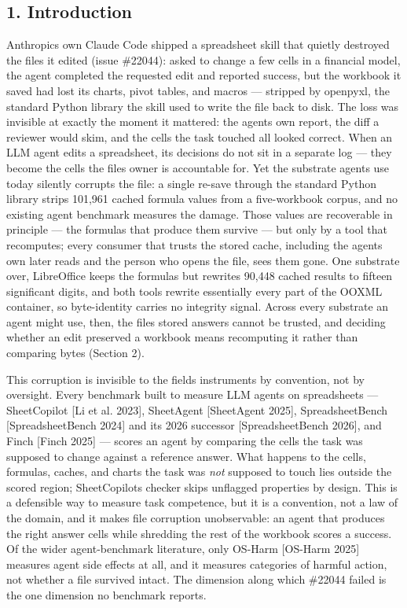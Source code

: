 \documentclass[
]{article}
\begin{document}
\subsection{1. Introduction}\label{1-introduction}

Anthropic\textquotesingle s own Claude Code shipped a spreadsheet skill
that quietly destroyed the files it edited (issue \#22044): asked to
change a few cells in a financial model, the agent completed the
requested edit and reported success, but the workbook it saved had lost
its charts, pivot tables, and macros --- stripped by openpyxl, the
standard Python library the skill used to write the file back to disk.
The loss was invisible at exactly the moment it mattered: the
agent\textquotesingle s own report, the diff a reviewer would skim, and
the cells the task touched all looked correct. When an LLM agent edits a
spreadsheet, its decisions do not sit in a separate log --- they become
the cells the file\textquotesingle s owner is accountable for. Yet the
substrate agents use today silently corrupts the file: a single re-save
through the standard Python library strips 101,961 cached formula values
from a five-workbook corpus, and no existing agent benchmark measures
the damage. Those values are recoverable in principle --- the formulas
that produce them survive --- but only by a tool that recomputes; every
consumer that trusts the stored cache, including the
agent\textquotesingle s own later reads and the person who opens the
file, sees them gone. One substrate over, LibreOffice keeps the formulas
but rewrites 90,448 cached results to fifteen significant digits, and
both tools rewrite essentially every part of the OOXML container, so
byte-identity carries no integrity signal. Across every substrate an
agent might use, then, the file\textquotesingle s stored answers cannot
be trusted, and deciding whether an edit preserved a workbook means
recomputing it rather than comparing bytes (Section 2).

This corruption is invisible to the field\textquotesingle s instruments
by convention, not by oversight. Every benchmark built to measure LLM
agents on spreadsheets --- SheetCopilot {[}Li et al. 2023{]}, SheetAgent
{[}SheetAgent 2025{]}, SpreadsheetBench {[}SpreadsheetBench 2024{]} and
its 2026 successor {[}SpreadsheetBench 2026{]}, and Finch {[}Finch
2025{]} --- scores an agent by comparing the cells the task was supposed
to change against a reference answer. What happens to the cells,
formulas, caches, and charts the task was \emph{not} supposed to touch
lies outside the scored region; SheetCopilot\textquotesingle s checker
skips unflagged properties by design. This is a defensible way to
measure task competence, but it is a convention, not a law of the
domain, and it makes file corruption unobservable: an agent that
produces the right answer cells while shredding the rest of the workbook
scores a success. Of the wider agent-benchmark literature, only OS-Harm
{[}OS-Harm 2025{]} measures agent side effects at all, and it measures
categories of harmful action, not whether a file survived intact. The
dimension along which \#22044 failed is the one dimension no benchmark
reports.
\end{document}
